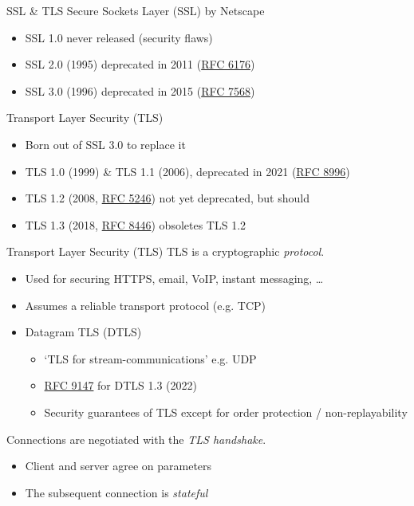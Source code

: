 \begin{frame}{SSL \& TLS}
  Secure Sockets Layer (SSL) by Netscape
  \begin{itemize}[<+(1)->]
    \item SSL 1.0 never released (security flaws)
    \item SSL 2.0 (1995) deprecated in 2011 (\href{https://datatracker.ietf.org/doc/html/rfc6176}{RFC 6176})
    \item SSL 3.0 (1996) deprecated in 2015 (\href{https://datatracker.ietf.org/doc/html/rfc7568}{RFC 7568}) 
  \end{itemize}

  \vspace*{1em}

  \pause
  Transport Layer Security (TLS)
  \begin{itemize}[<+(1)->]
    \item Born out of SSL 3.0 to replace it
    \item TLS 1.0 (1999) \& TLS 1.1 (2006), deprecated in 2021 (\href{https://datatracker.ietf.org/doc/html/rfc8996}{RFC 8996})
    \item TLS 1.2 (2008, \href{https://datatracker.ietf.org/doc/html/rfc5246}{RFC 5246}) not yet deprecated, but should
    \item TLS 1.3 (2018, \href{https://datatracker.ietf.org/doc/html/rfc8446}{RFC 8446}) obsoletes TLS 1.2
  \end{itemize}
\end{frame}

\begin{frame}{Transport Layer Security (TLS)}
  TLS is a cryptographic \emph{protocol}.
  \begin{itemize}[<+(1)->]
    \item Used for securing HTTPS, email, VoIP, instant messaging, \dots
    \item Assumes a reliable transport protocol (e.g. TCP)
    \item Datagram TLS (DTLS)
    \begin{itemize}
      \item `TLS for stream-communications' e.g. UDP
      \item \href{https://datatracker.ietf.org/doc/html/rfc9147}{RFC 9147} for DTLS 1.3 (2022)
      \item Security guarantees of TLS except for order protection / non-replayability
    \end{itemize}
  \end{itemize}

  \vspace*{1em}

  \pause
  Connections are negotiated with the \emph{TLS handshake}.
  \begin{itemize}[<+(1)->]
    \item Client and server agree on parameters
    \item The subsequent connection is \emph{stateful}
  \end{itemize}
\end{frame}

